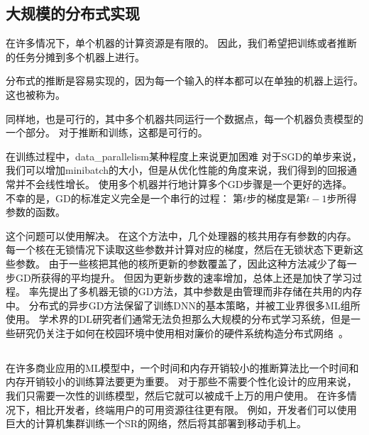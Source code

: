 \subsection{大规模的分布式实现}
\label{sec:large_scale_distributed_implementations}

在许多情况下，单个机器的计算资源是有限的。
因此，我们希望把训练或者推断的任务分摊到多个机器上进行。

分布式的推断是容易实现的，因为每一个输入的样本都可以在单独的机器上运行。
这也被称为。

同样地，也是可行的，其中多个机器共同运行一个数据点，每一个机器负责模型的一个部分。
对于推断和训练，这都是可行的。



在训练过程中，\gls{data_parallelism}某种程度上来说更加困难
对于\gls{SGD}的单步来说，我们可以增加\gls{minibatch}的大小，但是从优化性能的角度来说，我们得到的回报通常并不会线性增长。
使用多个机器并行地计算多个\gls{GD}步骤是一个更好的选择。
不幸的是，\gls{GD}的标准定义完全是一个串行的过程：
第$t$步的梯度是第$t-1$步所得参数的函数。


这个问题可以使用\citep{BenDucVin01-small,Recht-et-al-NIPS2011}解决。
在这个方法中，几个处理器的核共用存有参数的内存。
每一个核在无锁情况下读取这些参数并计算对应的梯度，然后在无锁状态下更新这些参数。
由于一些核把其他的核所更新的参数覆盖了，因此这种方法减少了每一步\gls{GD}所获得的平均提升。
但因为更新步数的速率增加，总体上还是加快了学习过程。
\citet{Dean-et-al-NIPS2012}率先提出了多机器无锁的\gls{GD}方法，其中参数是由管理而非存储在共用的内存中。
分布式的异步\gls{GD}方法保留了训练\gls{DNN}的基本策略，并被工业界很多\gls{ML}组所使用\citep{chilimbi2014project,Wu-et-al-arXiv2015}。
学术界的\gls{DL}研究者们通常无法负担那么大规模的分布式学习系统，但是一些研究仍关注于如何在校园环境中使用相对廉价的硬件系统构造分布式网络~\citep{icml2013_coates13}。


\subsection{}
\label{sec:model_compression}

在许多商业应用的\gls{ML}模型中，一个时间和内存开销较小的推断算法比一个时间和内存开销较小的训练算法要更为重要。
对于那些不需要个性化设计的应用来说，我们只需要一次性的训练模型，然后它就可以被成千上万的用户使用。
在许多情况下，相比开发者，终端用户的可用资源往往更有限。
例如，开发者们可以使用巨大的计算机集群训练一个\gls{SR}的网络，然后将其部署到移动手机上。


